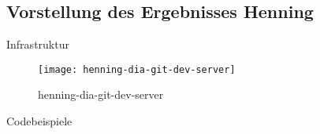 

\subsection{Vorstellung des Ergebnisses Henning}


Infrastruktur


\begin{figure}[H]
    \centering
    \caption[]{henning-dia-git-dev-server}
    \label{fig:henning-dia-git-dev-server}
    \texttt{[image: henning-dia-git-dev-server]}
\end{figure}



Codebeispiele
